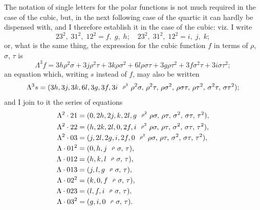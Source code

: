\documentclass[11pt,a4paper]{book}
\begin{document}
\begin{art}\label{art:50}
The notation of single letters for the polar functions is not much required in the case of the cubic, but, in the next following case of the quartic it can hardly be dispensed with, and I therefore establish it in the case of the cubic: viz. I write
\[
23^2,\; 31^2,\; 12^2 = f,\; g,\; h;\quad 23^2,\; 31^2,\; 12^2 = i,\; j,\; k;
\]
or, what is the same thing, the expression for the cubic function $f$ in terms of $\rho$, $\sigma$, $\tau$ is
\[
\Lambda^3 f = 3h\rho^2\sigma + 3j\rho^2\tau + 3k\rho\sigma^2 + 6l\rho\sigma\tau + 3g\rho\tau^2 + 3f\sigma^2\tau + 3i\sigma\tau^2;
\]
an equation which, writing $s$ instead of $f$, may also be written
\[
\Lambda^3 s = (3h, 3j, 3k, 6l, 3g, 3f, 3i \,\,\,\, \raisebox{0.5ex}{\text{\scriptsize$\rho^3$}}\,\, \rho^2\sigma,\, \rho^2\tau,\, \rho\sigma^2,\, \rho\sigma\tau,\, \rho\tau^2,\, \sigma^2\tau,\, \sigma\tau^2);
\]
and I join to it the series of equations
\begin{align*}
\Lambda^2 \cdot 21 &= (0, 2h, 2j, k, 2l, g \,\,\,\, \raisebox{0.5ex}{\text{\scriptsize$\rho^2$}}\,\, \rho\sigma,\, \rho\tau,\, \sigma^2,\, \sigma\tau,\, \tau^2),\\
\Lambda^2 \cdot 22 &= (h, 2k, 2l, 0, 2f, i \,\,\,\, \raisebox{0.5ex}{\text{\scriptsize$\rho^2$}}\,\, \rho\sigma,\, \rho\tau,\, \sigma^2,\, \sigma\tau,\, \tau^2),\\
\Lambda^2 \cdot 03 &= (j, 2l, 2g, i, 2f, 0 \,\,\,\, \raisebox{0.5ex}{\text{\scriptsize$\rho^2$}}\,\, \rho\sigma,\, \rho\tau,\, \sigma^2,\, \sigma\tau,\, \tau^2),\\
\Lambda \cdot 01^2 &= (0, h, j \,\,\,\, \raisebox{0.5ex}{\text{\scriptsize$\rho$}}\,\, \sigma,\, \tau),\\
\Lambda \cdot 012 &= (h, k, l \,\,\,\, \raisebox{0.5ex}{\text{\scriptsize$\rho$}}\,\, \sigma,\, \tau),\\
\Lambda \cdot 013 &= (j, l, g \,\,\,\, \raisebox{0.5ex}{\text{\scriptsize$\rho$}}\,\, \sigma,\, \tau),\\
\Lambda \cdot 02^2 &= (k, 0, f \,\,\,\, \raisebox{0.5ex}{\text{\scriptsize$\rho$}}\,\, \sigma,\, \tau),\\
\Lambda \cdot 023 &= (l, f, i \,\,\,\, \raisebox{0.5ex}{\text{\scriptsize$\rho$}}\,\, \sigma,\, \tau),\\
\Lambda \cdot 03^2 &= (g, i, 0 \,\,\,\, \raisebox{0.5ex}{\text{\scriptsize$\rho$}}\,\, \sigma,\, \tau).
\end{align*}
\end{art}
\end{document}
